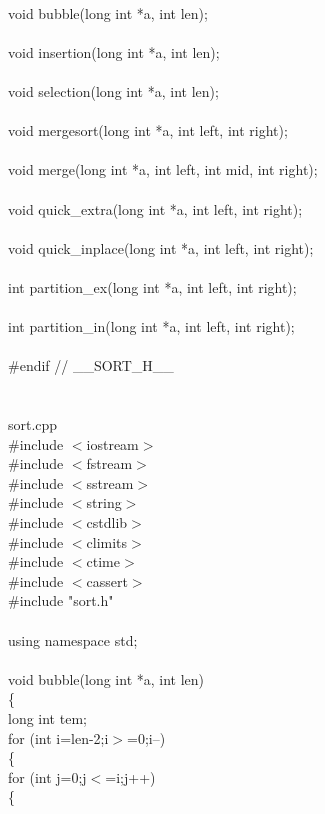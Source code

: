 \documentclass{article}
\begin{document}
\\
void bubble(long int *a, int len);\\
\\
void insertion(long int *a, int len);\\
\\
void selection(long int *a, int len);\\
\\
void mergesort(long int *a, int left, int right);\\
\\
void merge(long int *a, int left, int mid, int right);\\
\\
void quick\_extra(long int *a, int left, int right);\\
\\
void quick\_inplace(long int *a, int left, int right);\\
\\
int partition\_ex(long int *a, int left, int right);\\
\\
int partition\_in(long int *a, int left, int right);\\
\\
\#endif // \_\_SORT\_H\_\_\\
\\
\\
sort.cpp\\
\#include $<$iostream$>$\\
\#include $<$fstream$>$\\
\#include $<$sstream$>$\\
\#include $<$string$>$\\
\#include $<$cstdlib$>$\\
\#include $<$climits$>$\\
\#include $<$ctime$>$\\
\#include $<$cassert$>$\\
\#include "sort.h"\\
\\
using namespace std;\\
\\
void bubble(long int *a, int len)\\
\{\\
    long int tem;\\
    for (int i=len-2;i$>$=0;i--)\\
    \{\\
        for (int j=0;j$<$=i;j++)\\
        \{\\
\end{document}
